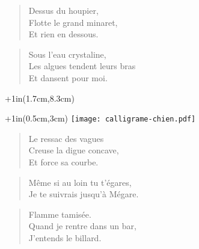 \begin{verse}\haiku
  Dessus du houpier,\\  %
  Flotte le grand minaret,\\  %
  Et rien en dessous.
\end{verse}

\begin{verse}\haiku
  Sous l’eau crystaline,\\  %
  Les algues tendent leurs bras\\  %
  Et dansent pour moi.
\end{verse}

\newpage{}

\begin{textblock*}{\textwidth+1in}(1.7cm,8.3cm) 
  \calligramme
\end{textblock*}
\begin{textblock*}{\textwidth+1in}(0.5cm,3cm) 
  \texttt{[image: calligrame-chien.pdf]}
\end{textblock*}

\begin{verse}\haiku
  Le ressac des vagues\\  %
  Creuse la digue concave,\\  %
  Et force sa courbe.
\end{verse}

\begin{verse}\distique%
  Même si au loin tu t’égares,\\
  Je te suivrais jusqu’à Mégare.
\end{verse}
\newpage{}

\begin{verse}\haiku
  Flamme tamisée.\\  %
  Quand je rentre dans un bar,\\  %
  J’entends le billard.
\end{verse}



